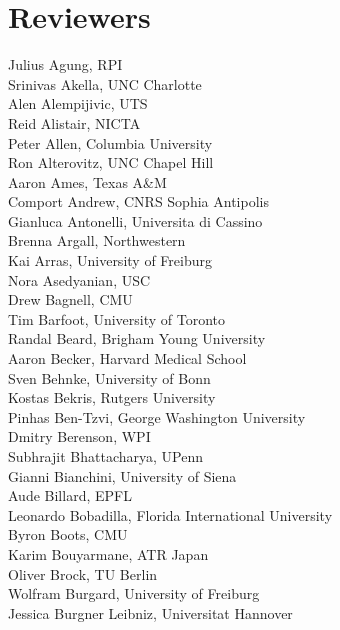 \titleformat{\chapter}{\bf \huge}{\thechapter}{1cm}{}
\chapter{Reviewers}

\vspace{-2cm}
\begin{multicols}{3}
{
\noindent
Julius Agung, RPI\\
Srinivas Akella, UNC Charlotte\\
Alen Alempijivic, UTS\\
Reid Alistair, NICTA\\
Peter Allen, Columbia University\\
Ron Alterovitz, UNC Chapel Hill\\
Aaron Ames, Texas A\&M\\
Comport Andrew, CNRS Sophia Antipolis\\
Gianluca Antonelli, Universita di Cassino\\
Brenna Argall, Northwestern\\
Kai Arras, University of Freiburg\\
Nora Asedyanian, USC\\
Drew Bagnell, CMU\\
Tim Barfoot, University of Toronto\\
Randal Beard, Brigham Young University\\
Aaron Becker, Harvard Medical School\\
Sven Behnke, University of Bonn\\
Kostas Bekris, Rutgers University\\
Pinhas Ben-Tzvi, George Washington University\\
Dmitry Berenson, WPI\\
Subhrajit Bhattacharya, UPenn\\
Gianni Bianchini, University of Siena\\
Aude Billard, EPFL\\
Leonardo Bobadilla, Florida International University\\
Byron Boots, CMU\\
Karim Bouyarmane, ATR Japan\\
Oliver Brock, TU Berlin\\
Wolfram Burgard, University of Freiburg\\
Jessica Burgner Leibniz, Universitat Hannover\\
}
\end{multicols}
